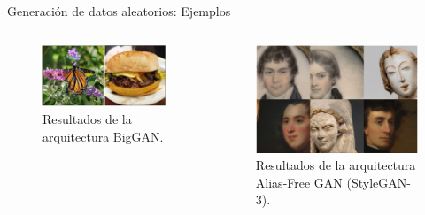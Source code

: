 \begin{frame}{Generación de datos aleatorios: Ejemplos}

    \begin{columns}[T]
    \begin{column}{.48\textwidth}
    
    \begin{figure}
        \centering
        \includegraphics[width=\textwidth]{Slides/figures/GAN/BigGAN.PNG}
        \caption{Resultados de la arquitectura BigGAN\cite{brock2018large}.}
    \end{figure}
    
    \end{column}
    \hfill
    \begin{column}{.48\textwidth}
    
    \begin{figure}
        \centering
        \includegraphics[width=\textwidth]{Slides/figures/GAN/Alias-FreeGAN.PNG}
        \caption{Resultados de la arquitectura Alias-Free GAN (StyleGAN-3)\cite{karras2021alias}.}
    \end{figure}

    \end{column}
    \end{columns}

\end{frame}

